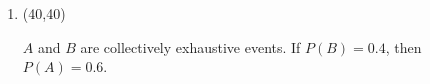 \documentclass[11pt,twoside]{article}
\numberwithin{equation}{section}
\newcommand{\?}{\stackrel{?}{=}}
\newcommand{\fr}{\frac}
\newcommand{\gr}{\color{green!40!black}}
\begin{document}
\begin{enumerate}[\bf (i)]
  \smallskip

  \item \hfill
  \begin{minipage}{.1\linewidth}
    \framebox(40,40){\gr  }
  \end{minipage}\quad
  \begin{minipage}{.85\linewidth}
    $A$ and $B$ are collectively exhaustive events. If $P(B) = 0.4$, then $P(A) = 0.6$. %
  \end{minipage}
  
  
  
  


  \end{enumerate}
\end{document}
